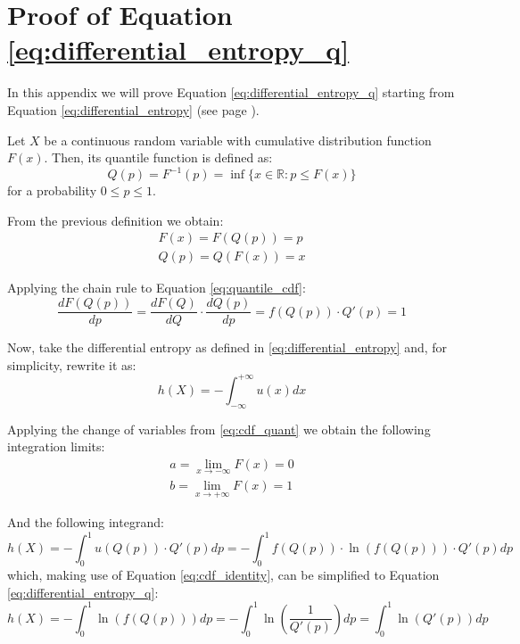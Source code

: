 \chapter{Proof of Equation \ref{eq:differential_entropy_q}}\label{entropy_proof}

In this appendix we will prove Equation \ref{eq:differential_entropy_q} starting from Equation \ref{eq:differential_entropy} (see page \pageref{eq:differential_entropy}).

Let $X$ be a continuous random variable with cumulative distribution function $F(x)$. Then, its quantile function is defined as:
\begin{equation}
Q(p) = F^{-1}(p) = \inf\{x \in \mathbb{R} : p \leq F(x)\}
\end{equation}
for a probability $0 \leq p \leq 1$.

From the previous definition we obtain:
\begin{align} 
F(x) = F(Q(p)) = p \label{eq:quantile_cdf} \\ 
Q(p) = Q(F(x)) = x \label{eq:cdf_quant}
\end{align}

Applying the chain rule to Equation \ref{eq:quantile_cdf}:
\begin{equation}\label{eq:cdf_identity}
\frac{dF(Q(p))}{dp} = \frac{dF(Q)}{dQ} \cdot \frac{dQ(p)}{dp} = f(Q(p)) \cdot Q'(p) = 1
\end{equation}

Now, take the differential entropy as defined in \ref{eq:differential_entropy} and, for simplicity, rewrite it as:
\begin{equation}
h(X) = - \int_{-\infty}^{+\infty} u(x) dx
\end{equation}

Applying the change of variables from \ref{eq:cdf_quant} we obtain the following integration limits:
\begin{align}
a = \lim_{x \to -\infty} F(x) = 0\\
b = \lim_{x \to +\infty} F(x) = 1
\end{align}

And the following integrand:
\begin{equation}
h(X) = - \int_{0}^{1} u(Q(p)) \cdot Q'(p) dp = - \int_{0}^{1} f(Q(p)) \cdot \ln(f(Q(p))) \cdot Q'(p) dp
\end{equation}
which, making use of Equation \ref{eq:cdf_identity}, can be simplified to Equation \ref{eq:differential_entropy_q}:
\begin{equation}
h(X) = -  \int_{0}^{1} \ln\left(f(Q(p))\right) dp = - \int_{0}^{1} \ln\left(\frac{1}{Q'(p)}\right) dp = \int_{0}^{1} \ln\left(Q'(p)\right) dp
\end{equation}